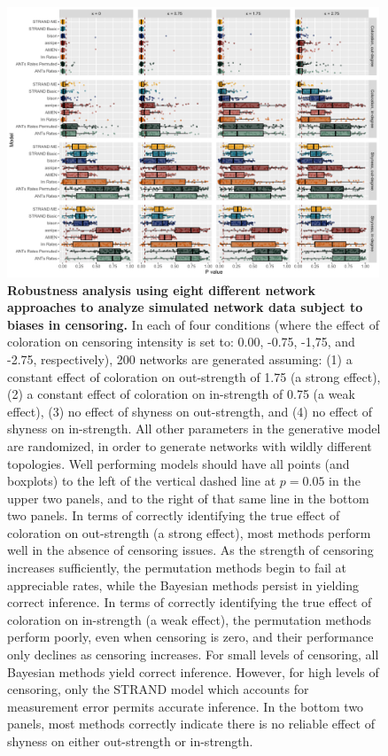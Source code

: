 \documentclass[Afour,sageh,times]{sagej}
\begin{document}
\begin{figure}[t]
  \caption{\textbf{Robustness analysis using eight different network approaches to analyze simulated network data subject to biases in censoring.} In each of four conditions (where the effect of coloration on censoring intensity is set to: 0.00, -0.75, -1,75, and -2.75, respectively), 200 networks are generated assuming: (1) a constant effect of coloration on out-strength of 1.75 (a strong effect),  (2) a constant effect of coloration on in-strength of 0.75 (a weak effect), (3) no effect of shyness on out-strength, and (4) no effect of shyness on in-strength. All other parameters in the generative model are randomized, in order to generate networks with wildly different topologies. Well performing models should have all points (and boxplots) to the left of the vertical dashed line at $p=0.05$ in the upper two panels, and to the right of that same line in the bottom two panels.
  In terms of correctly identifying the true effect of coloration on out-strength (a strong effect), most methods perform well in the absence of censoring issues. As the strength of censoring increases sufficiently, the permutation methods begin to fail at appreciable rates, while the Bayesian methods persist in yielding correct inference.   In terms of correctly identifying the true effect of coloration on in-strength (a weak effect), the permutation methods perform poorly, even when censoring is zero, and their performance only declines as censoring increases. For small levels of censoring, all Bayesian methods yield correct inference. However, for high levels of censoring, only the STRAND model which accounts for measurement error permits accurate inference. In the bottom two panels, most methods correctly indicate there is no reliable effect of shyness on either out-strength or in-strength.
  }  \label{blast2}
  \centering
      \includegraphics[width=0.99\textwidth]{Figures/Censoring_Robustness_data.pdf}
\end{figure}
\end{document}
